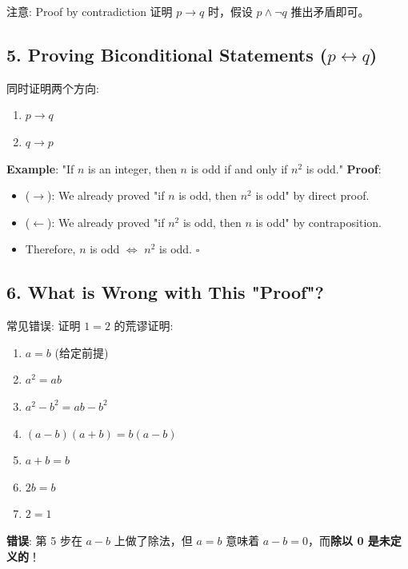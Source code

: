 \documentclass[10pt,a4paper,openany]{ctexbook}
\theoremstyle{definition}
\theoremstyle{remark}
\begin{document}
注意: Proof by contradiction 证明 $p \to q$ 时，假设 $p \land \neg q$ 推出矛盾即可。
\vspace{-2pt}

\subsection{5. Proving Biconditional Statements ($p \leftrightarrow q$)}

同时证明两个方向:
\begin{enumerate}
\item $p \to q$
\item $q \to p$

\end{enumerate}

\textbf{Example}: "If $n$ is an integer, then $n$ is odd if and only if $n^2$ is odd."
\textbf{Proof}:
\begin{itemize}
\item ($\to$): We already proved "if $n$ is odd, then $n^2$ is odd" by direct proof.
\item ($\leftarrow$): We already proved "if $n^2$ is odd, then $n$ is odd" by contraposition.
\item Therefore, $n$ is odd $\iff$ $n^2$ is odd. $\square$

\end{itemize}

\vspace{-2pt}

\subsection{6. What is Wrong with This "Proof"?}

常见错误: 证明 $1 = 2$ 的荒谬证明:
\begin{enumerate}
\item $a = b$ (给定前提)
\item $a^2 = ab$
\item $a^2 - b^2 = ab - b^2$
\item $(a-b)(a+b) = b(a-b)$
\item $a + b = b$
\item $2b = b$
\item $2 = 1$

\end{enumerate}

\textbf{错误}: 第 5 步在 $a-b$ 上做了除法，但 $a = b$ 意味着 $a-b = 0$，而\textbf{除以 0 是未定义的}！
\vspace{-2pt}
\end{document}
